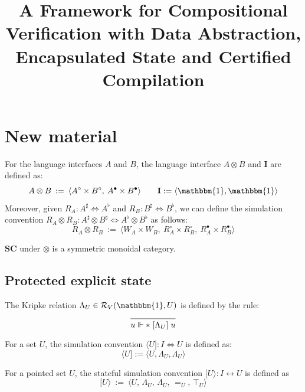 \documentclass[acmsmall,screen,review,anonymous]{acmart}
\title{A Framework for Compositional Verification with
  Data Abstraction, Encapsulated State and Certified Compilation}
\newcommand{\ifr}[1]{\mathrel{[{#1}]}}
\newcommand{\que}{\circ}
\newcommand{\ans}{\bullet}
\newcommand{\caller}[1]{\langle #1 ]}
\newcommand{\callee}[1]{[ #1 \rangle}
\begin{document}
\maketitle

\section*{New material} %

\begin{definition} \label{def:sctens}
For the language interfaces $A$ and $B$,
the language interface $A \otimes B$ and $\mathbf{I}$
are defined as:
\[
  A \otimes B \::=\:
  \langle
    A^\que \times B^\que, \:
    A^\ans \times B^\ans
  \rangle
  \qquad
  \mathbf{I} := \langle \mathbbm{1}, \mathbbm{1} \rangle
\]
Moreover,
given $R_A : A^\sharp \Leftrightarrow A^\flat$
and $R_B : B^\sharp \Leftrightarrow B^\flat$,
we can define the simulation convention
$R_A \otimes R_B : A^\sharp \otimes B^\sharp
  \Leftrightarrow
  A^\flat \otimes B^\flat$
as follows:
\[
  R_A \otimes R_B \: := \:
    \big\langle
      W_A \times W_B, \:
      R_A^\que \times R_B^\que, \:
      R_A^\ans \times R_B^\ans
    \big\rangle
\]
\end{definition}

\begin{theorem}
$\mathbf{SC}$ under $\otimes$ is a symmetric monoidal category.
\end{theorem}

\subsection*{Protected explicit state}

The Kripke relation
$\Lambda_U \in \mathcal{R}_V(\mathbbm{1}, U)$
is defined by the rule:
\[
  \begin{prooftree}
    \infer0{u \Vdash * \ifr{\Lambda_U} u}
  \end{prooftree}
\]

\begin{definition}
For a set $U$,
the simulation convention $\caller{U} : I \Leftrightarrow U$
is defined as:
\[
  \caller{U} := \big\langle U,
      \Lambda_U,
      \Lambda_U
    \big\rangle
\]
\end{definition}

\begin{definition}
For a pointed set $U$,
the stateful simulation convention
$\callee{U} : I \leftrightarrow U$
is defined as
\[
  \callee U \: := \: \big\langle
      U, \,
      \Lambda_U, \,
      \Lambda_U, \,
      {=}_U, \,
      \top_U
    \big\rangle
\]
\end{definition}
\end{document}
